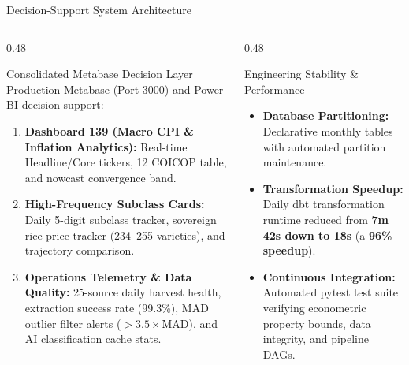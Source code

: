 \documentclass[aspectratio=169, 10pt]{beamer}
\begin{document}
\begin{frame}{Decision-Support System Architecture}
  \begin{columns}
    \begin{column}{0.48\textwidth}
      \begin{block}{Consolidated Metabase Decision Layer}
        Production Metabase (Port 3000) and Power BI decision support:
        \begin{enumerate}
          \item \textbf{Dashboard 139 (Macro CPI \& Inflation Analytics):} Real-time Headline/Core tickers, 12 COICOP table, and nowcast convergence band.
          \item \textbf{High-Frequency Subclass Cards:} Daily 5-digit subclass tracker, sovereign rice price tracker (234--255 varieties), and trajectory comparison.
          \item \textbf{Operations Telemetry \& Data Quality:} 25-source daily harvest health, extraction success rate (99.3\%), MAD outlier filter alerts ($>3.5\times\text{MAD}$), and AI classification cache stats.
        \end{enumerate}
      \end{block}
    \end{column}

    \begin{column}{0.48\textwidth}
      \begin{exampleblock}{Engineering Stability \& Performance}
        \begin{itemize}
          \item \textbf{Database Partitioning:} Declarative monthly tables with automated partition maintenance.
          \item \textbf{Transformation Speedup:} Daily dbt transformation runtime reduced from \textbf{7m 42s down to 18s} (a \textbf{96\% speedup}).
          \item \textbf{Continuous Integration:} Automated pytest test suite verifying econometric property bounds, data integrity, and pipeline DAGs.
        \end{itemize}
      \end{exampleblock}
    \end{column}
  \end{columns}
\end{frame}

\end{document}
